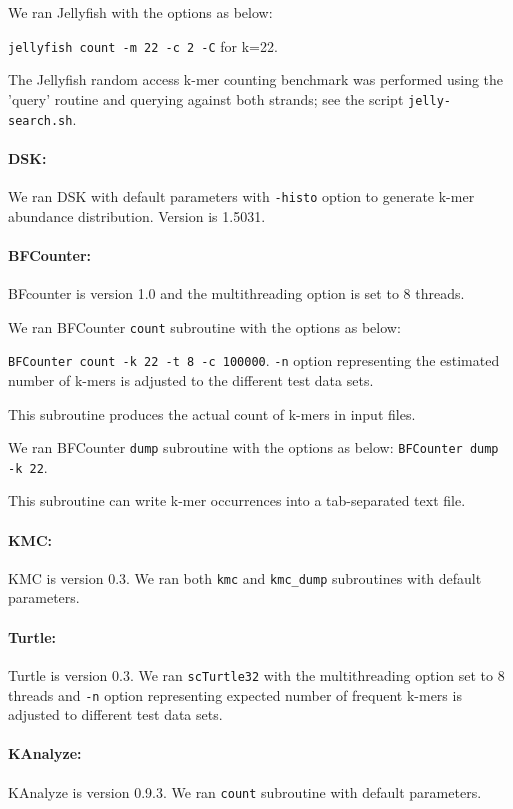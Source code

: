 \documentclass[10pt]{article}
\begin{document}
We ran Jellyfish with the options as below:

{\tt jellyfish count -m 22 -c 2 -C} for k=22.


The Jellyfish random access k-mer counting benchmark was performed
using the 'query' routine and querying against both strands; see
the script {\tt jelly-search.sh}.

\paragraph{DSK:} We ran DSK with default parameters with {\tt -histo} option to generate
k-mer abundance distribution. Version is 1.5031.

\paragraph{BFCounter:} BFcounter is version 1.0 and the multithreading option is set to 8
 threads.
 
We ran BFCounter {\tt count} subroutine with the options as below:
 
 {\tt BFCounter count -k 22 -t 8 -c 100000}.
 {\tt -n} option representing the estimated number of k-mers is adjusted to the different 
 test data sets.
 
 This subroutine produces the actual count of k-mers in input files.
 
We ran BFCounter {\tt dump} subroutine with the options as below:
 {\tt BFCounter dump -k 22}.
 
This subroutine can write k-mer occurrences into a tab-separated text file.

\paragraph{KMC:} KMC is version 0.3. We ran both {\tt kmc} and {\tt kmc\_dump} subroutines 
with default parameters.


\paragraph{Turtle:} Turtle is version 0.3. We ran {\tt scTurtle32} with the multithreading 
option set to 8 threads and {\tt -n} option representing expected number of frequent k-mers
is adjusted to different test data sets.

\paragraph{KAnalyze:} KAnalyze is version 0.9.3. We ran {\tt count} subroutine 
with default parameters.
\end{document}
